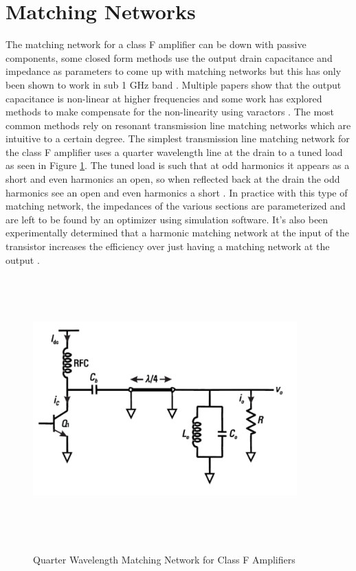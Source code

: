 \section{Matching Networks}

The matching network for a class F amplifier can be down with passive components, some closed form methods use the output drain capacitance and impedance as parameters to come up with matching networks but this has only been shown to work in sub 1 GHz band \cite{Grebennikov2000}. Multiple papers show that the output capacitance is non-linear at higher frequencies and some work has explored methods to make compensate for the non-linearity using varactors \cite{Kye-Ik1997}. The most common methods rely on resonant transmission line matching networks which are intuitive to a certain degree. The simplest transmission line matching network for the class F amplifier uses a quarter wavelength line at the drain to a tuned load as seen in Figure \ref{fig:quarter_wave_match}. The tuned load is such that at odd harmonics it appears as a short and even harmonics an open, so when reflected back at the drain the odd harmonics see an open and even harmonics a short \cite{Gao2006}. In practice with this type of matching network, the impedances of the various sections are parameterized and are left to be found by an optimizer using simulation software. It's also been experimentally determined that a harmonic matching network at the input of the transistor increases the efficiency over just having a matching network at the output \cite{Colantonio2001}.

\begin{figure}
  \centering
  \includegraphics[width=4in,height=4in,keepaspectratio]{figures/detail/quarter_wave_match}\\
  \caption{Quarter Wavelength Matching Network for Class F Amplifiers}
  \label{fig:quarter_wave_match}
\end{figure}


